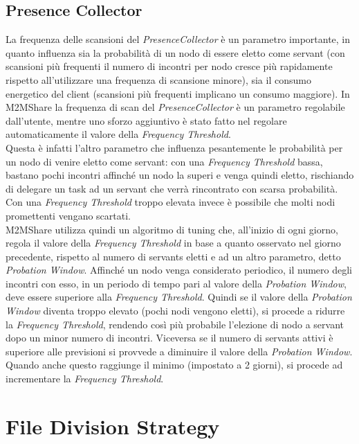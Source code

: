 \subsection{Presence Collector} 
\label{descrPresenceCollector}
La frequenza delle scansioni del \textit{PresenceCollector} è un parametro importante, in quanto influenza sia la probabilità di un nodo di essere eletto come servant (con scansioni più frequenti il numero di incontri per nodo cresce più rapidamente rispetto all'utilizzare una frequenza di scansione minore), sia il consumo energetico del client (scansioni più frequenti implicano un consumo maggiore). In M2MShare la frequenza di scan del \textit{PresenceCollector} è un parametro regolabile dall'utente, mentre uno sforzo aggiuntivo è stato fatto nel regolare automaticamente il valore della \textit{Frequency Threshold}.
\\

Questa è infatti l'altro parametro che influenza pesantemente le probabilità per un nodo di venire eletto come servant: con una \textit{Frequency Threshold} bassa, bastano pochi incontri affinché un nodo la superi e venga quindi eletto, rischiando di delegare un task ad un servant che verrà rincontrato con scarsa probabilità. Con una \textit{Frequency Threshold} troppo elevata invece è possibile che molti nodi promettenti vengano scartati.
\\

M2MShare utilizza quindi un algoritmo di tuning che, all'inizio di ogni giorno, regola il valore della \textit{Frequency Threshold} in base a quanto osservato nel giorno precedente, rispetto al numero di servants eletti e ad un altro parametro, detto \textit{Probation Window}. Affinché un nodo venga considerato periodico, il numero degli incontri con esso, in un periodo di tempo pari al valore della \textit{Probation Window}, deve essere superiore alla \textit{Frequency Threshold}. Quindi se il valore della \textit{Probation Window} diventa troppo elevato (pochi nodi vengono eletti), si procede a ridurre la \textit{Frequency Threshold}, rendendo così più probabile l'elezione di nodo a servant dopo un minor numero di incontri. Viceversa se il numero di servants attivi è superiore alle previsioni si provvede a diminuire il valore della \textit{Probation Window}. Quando anche questo raggiunge il minimo (impostato a 2 giorni), si procede ad incrementare la \textit{Frequency Threshold}.
\\



\section{File Division Strategy}
\label{descrFileDivisionStrategy}
 

